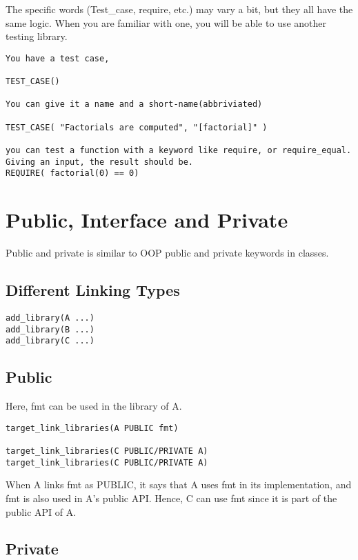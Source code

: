 \documentclass[openany]{report}
\begin{document}
The specific words (Test\_case, require, etc.) may vary a bit, but they all have the same logic. When you are familiar with one, 
you will be able to use another testing library.

\begin{verbatim}
You have a test case, 

TEST_CASE()

You can give it a name and a short-name(abbriviated)

TEST_CASE( "Factorials are computed", "[factorial]" )

you can test a function with a keyword like require, or require_equal. Giving an input, the result should be. 
REQUIRE( factorial(0) == 0)
\end{verbatim}

\section{Public, Interface and Private}

Public and private is similar to OOP public and private keywords in classes.

\subsection{Different Linking Types}

\begin{verbatim}
add_library(A ...)
add_library(B ...)
add_library(C ...)
\end{verbatim}

\subsection{Public}

Here, fmt can be used in the library of A. 

\begin{verbatim}
target_link_libraries(A PUBLIC fmt)

target_link_libraries(C PUBLIC/PRIVATE A)
target_link_libraries(C PUBLIC/PRIVATE A)
\end{verbatim}

When A links fmt as PUBLIC, it says that A uses fmt in its implementation, and fmt is also used in A's public API.
Hence, C can use fmt since it is part of the public API of A.

\subsection{Private}
\end{document}
